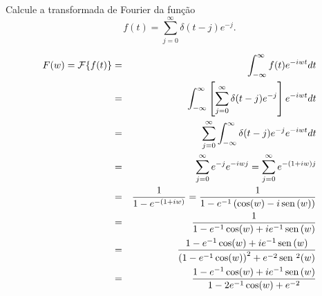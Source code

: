 \begin{Exercise} Calcule a transformada de Fourier da função
\begin{equation}f(t)=\sum_{j=0}^\infty \delta(t-j) e^{-j}.\end{equation}
\end{Exercise}
\begin{Answer} 
\begin{eqnarray*}
F(w)=\mathcal{F}\{f(t)\}&=&\int_{-\infty}^\infty f(t) e^{-i w t}dt\\
&=&\int_{-\infty}^\infty \left[\sum_{j=0}^\infty\delta(t-j)e^{-j}\right] e^{-i w t}dt\\
&=&\sum_{j=0}^\infty\int_{-\infty}^\infty \delta(t-j)e^{-j} e^{-i w t}dt\\
&=&\sum_{j=0}^\infty e^{-j} e^{-i w j}
=\sum_{j=0}^\infty e^{-(1+i w) j}\\
&=&\frac{1}{1-e^{-(1+i w)}}=\frac{1}{1-e^{-1}\left(\cos(w)-i\operatorname{sen}\,(w)\right)}\\
&=&\frac{1}{1-e^{-1}\cos(w)+ie^{-1}\operatorname{sen}\,(w)}\\
&=&\frac{1-e^{-1}\cos(w)+ie^{-1}\operatorname{sen}\,(w)}{\left(1-e^{-1}\cos(w)\right)^2+e^{-2}\operatorname{sen}\,^2(w)}\\
&=&\frac{1-e^{-1}\cos(w)+ie^{-1}\operatorname{sen}\,(w)}{1-2e^{-1}\cos(w)+e^{-2}}\\
\end{eqnarray*}
\end{Answer}
